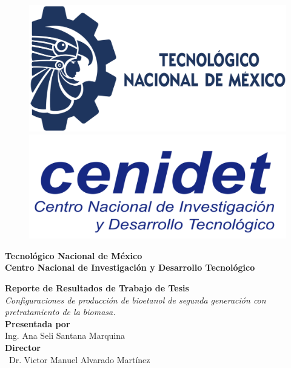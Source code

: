 \begin{titlepage}
	\begin{center}
			\begin{figure}[h]
			\includegraphics[scale=0.12]{tecnm.png} \hspace{7cm}
			\includegraphics[scale=0.1]{cenidet.png}
		\end{figure}
		\vspace{1.3cm}
		{\Huge\textbf{Tecnológico Nacional de México }}\\
		\vspace{5mm}
		{\Large\textbf{Centro Nacional de Investigación y Desarrollo Tecnológico}}\\
		\vspace{3mm}
	
		\vspace{1cm}
		{\Huge\textbf{Reporte de Resultados de Trabajo de Tesis}}\\
		\vspace{5mm}
		{\Large\textit{Configuraciones de producción de bioetanol de segunda generación con pretratamiento de la biomasa.}}\\
		\vspace{1.5cm}
		{\Large\textbf{Presentada por}}\\
		\vspace{0.5cm}
		{\Large{Ing. Ana Seli Santana Marquina}}\\
		\vspace{1.3cm}
		{\large\textbf{Director}}\\
		\vspace{0.5cm}
		{\large\ Dr. Victor Manuel Alvarado Martínez  }\\
		\vspace{0.5cm}
		

\end{center}
\end{titlepage}
